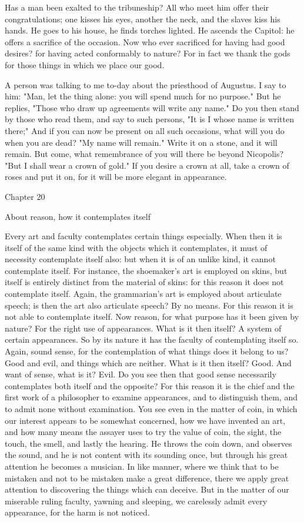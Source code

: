 \documentclass[a4paper]{article}
\begin{document}
Has a man been exalted to the tribuneship? All who meet him offer
their congratulations; one kisses his eyes, another the neck, and
the slaves kiss his hands. He goes to his house, he finds torches
lighted. He ascends the Capitol: he offers a sacrifice of the occasion.
Now who ever sacrificed for having had good desires? for having acted
conformably to nature? For in fact we thank the gods for those things
in which we place our good. 

A person was talking to me to-day about the priesthood of Augustus.
I say to him: "Man, let the thing alone: you will spend much for no
purpose." But he replies, "Those who draw up agreements will write
any name." Do you then stand by those who read them, and say to such
persons, "It is I whose name is written there;" And if you can now
be present on all such occasions, what will you do when you are dead?
"My name will remain." Write it on a stone, and it will remain. But
come, what remembrance of you will there be beyond Nicopolis? "But
I shall wear a crown of gold." If you desire a crown at all, take
a crown of roses and put it on, for it will be more elegant in appearance.

Chapter 20

About reason, how it contemplates itself 

Every art and faculty contemplates certain things especially. When
then it is itself of the same kind with the objects which it contemplates,
it must of necessity contemplate itself also: but when it is of an
unlike kind, it cannot contemplate itself. For instance, the shoemaker's
art is employed on skins, but itself is entirely distinct from the
material of skins: for this reason it does not contemplate itself.
Again, the grammarian's art is employed about articulate speech; is
then the art also articulate speech? By no means. For this reason
it is not able to contemplate itself. Now reason, for what purpose
has it been given by nature? For the right use of appearances. What
is it then itself? A system of certain appearances. So by its nature
it has the faculty of contemplating itself so. Again, sound sense,
for the contemplation of what things does it belong to us? Good and
evil, and things which are neither. What is it then itself? Good.
And want of sense, what is it? Evil. Do you see then that good sense
necessarily contemplates both itself and the opposite? For this reason
it is the chief and the first work of a philosopher to examine appearances,
and to distinguish them, and to admit none without examination. You
see even in the matter of coin, in which our interest appears to be
somewhat concerned, how we have invented an art, and how many means
the assayer uses to try the value of coin, the sight, the touch, the
smell, and lastly the hearing. He throws the coin down, and observes
the sound, and he is not content with its sounding once, but through
his great attention he becomes a musician. In like manner, where we
think that to be mistaken and not to be mistaken make a great difference,
there we apply great attention to discovering the things which can
deceive. But in the matter of our miserable ruling faculty, yawning
and sleeping, we carelessly admit every appearance, for the harm is
not noticed. 
\end{document}
